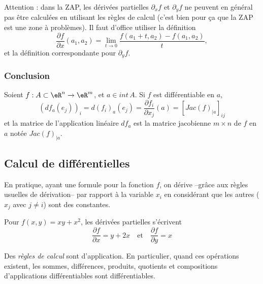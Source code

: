 Attention : dans la ZAP, les dérivées partielles $\partial_xf$ et $\partial_yf$ ne peuvent en général pas être calculées en utilisant les règles de calcul (c'est bien pour ça que la ZAP est une zone à problèmes). Il faut d'office utiliser la définition
\begin{equation}
    \frac{ \partial f }{ \partial x }(a_1,a_2)=\lim_{t\to 0}\frac{ f(a_1+t,a_2)-f(a_1,a_2) }{ t },
\end{equation}
et la définition correspondante pour $\partial_yf$.


\subsubsection*{Conclusion}
Soient $f:A\subset \eR^n \rightarrow \eR^m$, et $a\in int\,A$. Si $f$ est différentiable en $a$, $$ (df_a (e_j))_i = d(f_i)_a(e_j) =\frac{\partial f_i}{\partial x_j}(a)= [Jac(f)_{|a}]_{ij}$$ et la matrice de l'application linéaire $df_a$ est la matrice jacobienne $m\times n$ de $f$ en $a$ notée $Jac(f)_{|a}$.


                    \subsection{Calcul de différentielles}


\begin{remark}      \label{deriveepartielles}
  En pratique, ayant une formule pour la fonction $f$, on dérive --grâce aux règles usuelles de dérivation-- par rapport à la variable $x_i$ en considérant que les autres ($x_j$ avec $j \neq i$) sont des constantes.
\end{remark}

\begin{example}Pour $f(x,y) = xy + x^2$, les dérivées partielles
  s'écrivent
  \begin{equation*}
    \frac{\partial f}{\partial x} = y + 2x \quad\text{et}\quad \frac{\partial f}{\partial y} = x
  \end{equation*}
\end{example}


Des \emph{règles de calcul} sont d'application. En particulier, quand
ces opérations existent, les sommes, différences, produits, quotients
et compositions d'applications différentiables sont différentiables.

